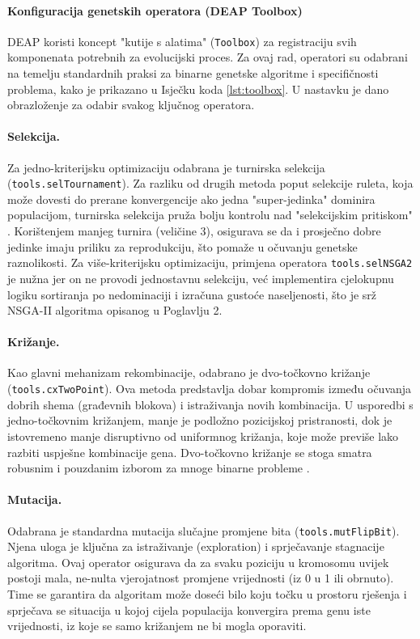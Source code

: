 \paragraph{Konfiguracija genetskih operatora (DEAP Toolbox)}

DEAP koristi koncept "kutije s alatima" (\texttt{Toolbox}) za registraciju svih komponenata potrebnih za evolucijski proces. Za ovaj rad, operatori su odabrani na temelju standardnih praksi za binarne genetske algoritme i specifičnosti problema, kako je prikazano u Isječku koda \ref{lst:toolbox}. U nastavku je dano obrazloženje za odabir svakog ključnog operatora.

\paragraph{Selekcija.}
     Za jedno-kriterijsku optimizaciju odabrana je turnirska selekcija \\ (\texttt{tools.selTournament}). Za razliku od drugih metoda poput selekcije ruleta, koja može dovesti do prerane konvergencije ako jedna "super-jedinka" dominira populacijom, turnirska selekcija pruža bolju kontrolu nad "selekcijskim pritiskom" \cite{Goldberg1989}. Korištenjem manjeg turnira (veličine 3), osigurava se da i prosječno dobre jedinke imaju priliku za reprodukciju, što pomaže u očuvanju genetske raznolikosti. Za više-kriterijsku optimizaciju, primjena operatora \texttt{tools.selNSGA2} je nužna jer on ne provodi jednostavnu selekciju, već implementira cjelokupnu logiku sortiranja po nedominaciji i izračuna gustoće naseljenosti, što je srž NSGA-II algoritma opisanog u Poglavlju 2.

\paragraph{Križanje.}
Kao glavni mehanizam rekombinacije, odabrano je dvo-točkovno križanje (\texttt{tools.cxTwoPoint}). Ova metoda predstavlja dobar kompromis između očuvanja dobrih shema (građevnih blokova) i istraživanja novih kombinacija. U usporedbi s jedno-točkovnim križanjem, manje je podložno pozicijskoj pristranosti, dok je istovremeno manje disruptivno od uniformnog križanja, koje može previše lako razbiti uspješne kombinacije gena. Dvo-točkovno križanje se stoga smatra robusnim i pouzdanim izborom za mnoge binarne probleme \cite{Mitchell1998}.

\paragraph{Mutacija.}
Odabrana je standardna mutacija slučajne promjene bita (\texttt{tools.mutFlipBit}). Njena uloga je ključna za istraživanje (exploration) i sprječavanje stagnacije algoritma. Ovaj operator osigurava da za svaku poziciju u kromosomu uvijek postoji mala, ne-nulta vjerojatnost promjene vrijednosti (iz 0 u 1 ili obrnuto). Time se garantira da algoritam može doseći bilo koju točku u prostoru rješenja i sprječava se situacija u kojoj cijela populacija konvergira prema genu iste vrijednosti, iz koje se samo križanjem ne bi mogla oporaviti.

